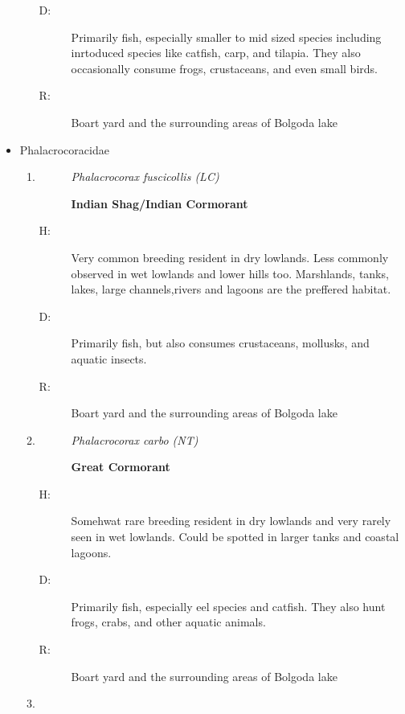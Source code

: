 \begin{itemize}
\begin{enumerate}
\begin{description}
\item[D: ]%
Primarily fish, especially smaller to mid sized species including inrtoduced species like catfish, carp, and tilapia. They also occasionally consume frogs, crustaceans, and even small birds.%
\item[R: ]%
Boart yard and the surrounding areas of Bolgoda lake%
\end{description}%
\end{enumerate}%
\item%
Phalacrocoracidae%
\begin{enumerate}%
\item%
\begin{description}%
\item[]%
\textit{Phalacrocorax fuscicollis (LC)}%
\item[]%
\textbf{Indian Shag/Indian Cormorant}%
\end{description}%
\begin{description}%
\item[H: ]%
Very common breeding resident in dry lowlands. Less commonly observed in wet lowlands and lower hills too. Marshlands, tanks, lakes, large channels,rivers and lagoons are the preffered habitat.%
\item[D: ]%
Primarily fish, but also consumes crustaceans, mollusks, and aquatic insects.%
\item[R: ]%
Boart yard and the surrounding areas of Bolgoda lake%
\end{description}%
\item%
\begin{description}%
\item[]%
\textit{Phalacrocorax carbo (NT)}%
\item[]%
\textbf{Great Cormorant}%
\end{description}%
\begin{description}%
\item[H: ]%
Somehwat rare breeding resident in dry lowlands and very rarely seen in wet lowlands. Could be spotted in larger tanks and coastal lagoons.%
\item[D: ]%
Primarily fish, especially eel species and catfish. They also hunt frogs, crabs, and other aquatic animals.%
\item[R: ]%
Boart yard and the surrounding areas of Bolgoda lake%
\end{description}%
\item%
\begin{description}%
\item[]%

\end{description}
\end{enumerate}
\end{itemize}
